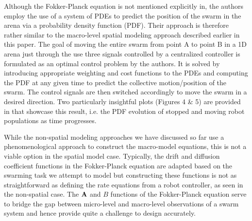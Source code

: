 \documentclass[Main.tex]{subfiles}
\begin{document}
Although the Fokker-Planck equation is not mentioned explicitly in\cite{Milutinovi2006}, the authors employ the use of a system of PDEs to predict the position of the swarm in the arena via a probability density function (PDF). Their approach is therefore rather similar to the macro-level spatial modeling approach described earlier in this paper. The goal of moving the entire swarm  from point A to point B in a 1D arena just through the use three signals controlled by a centralized controller is formulated as an optimal control problem by the authors. It is solved by introducing appropriate weighting and cost functions to the PDEs and computing the PDF at any given time to predict the collective motion/position of the swarm. The control signals are then switched accordingly to move the swarm in a desired direction. Two particularly insightful plots (Figures 4 \& 5) are provided in\cite{Milutinovi2006} that showcase this result, i.e. the PDF evolution of stopped and moving robot populations as time progresses.

While the non-spatial modeling approaches we have discussed so far use a phenomenological approach to construct the macro-model equations, this is not a viable option in the spatial model case. Typically, the drift and diffusion coefficient functions in the Fokker-Planck equation are adapted based on the swarming task we attempt to model but constructing these functions is not as straightforward as defining the rate equations from a robot controller, as seen in the non-spatial case. The $\mathbf{A}$ and $B$ functions of the Fokker-Planck equation serve to bridge the gap between micro-level and macro-level observations of a swarm system and hence provide quite a challenge to design accurately.
\end{document}
